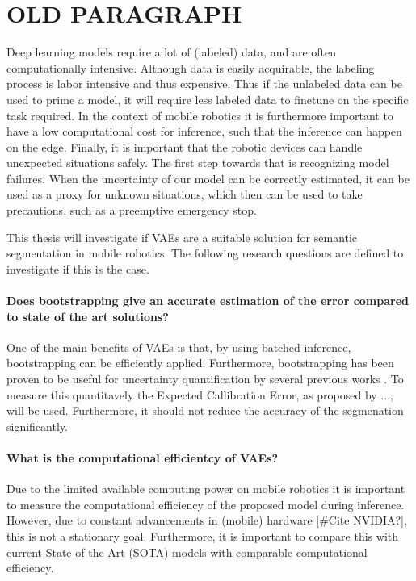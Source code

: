 \section*{OLD PARAGRAPH}
Deep learning models require a lot of (labeled) data, and are often computationally intensive. Although data is easily acquirable, the labeling process is labor intensive and thus expensive. Thus if the unlabeled data can be used to prime a model, it will require less labeled data to finetune on the specific task required. In the context of mobile robotics it is furthermore important to have a low computational cost for inference, such that the inference can happen on the edge. Finally, it is important that the robotic devices can handle unexpected situations safely. The first step towards that is recognizing model failures. When the uncertainty of our model can be correctly estimated, it can be used as a proxy for unknown situations, which then can be used to take precautions, such as a preemptive emergency stop.

This thesis will investigate if VAEs are a suitable solution for semantic segmentation in mobile robotics. The following research questions are defined to investigate if this is the case.

\paragraph*{Does bootstrapping give an accurate estimation of the error compared to state of the art solutions?} One of the main benefits of VAEs is that, by using batched inference, bootstrapping can be efficiently applied. Furthermore, bootstrapping has been proven to be useful for uncertainty quantification by several previous works \cite{chen2018use,kohl2018probabilistic,edupuganti2021uq_mri}. To measure this quantitavely the Expected Callibration Error, as proposed by ..., will be used. Furthermore, it should not reduce the accuracy of the segmenation significantly.

\paragraph*{What is the computational efficientcy of VAEs?} Due to the limited available computing power on mobile robotics it is important to measure the computational efficiency of the proposed model during inference. However, due to constant advancements in (mobile) hardware [\#Cite NVIDIA?], this is not a stationary goal. Furthermore, it is important to compare this with current State of the Art (SOTA) models with comparable computational efficiency.


